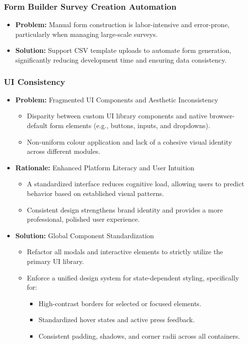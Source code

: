 \documentclass{article}
\begin{document}
\subsubsection{Form Builder Survey Creation Automation}

\begin{itemize}
    \item \textbf{Problem:} Manual form construction is labor-intensive and
    error-prone, particularly when managing large-scale surveys.
    \item \textbf{Solution:} Support CSV template uploads to automate form
    generation, significantly reducing development time and ensuring data
    consistency.
\end{itemize}

\subsubsection{UI Consistency}
\begin{itemize}
    \item \textbf{Problem:} Fragmented UI Components and Aesthetic Inconsistency
    \begin{itemize}
        \item Disparity between custom UI library components and native
        browser-default form elements (e.g., buttons, inputs, and dropdowns).
        \item Non-uniform colour application and lack of a cohesive visual
        identity across different modules.
    \end{itemize}
    
    \item \textbf{Rationale:} Enhanced Platform Literacy and User Intuition
    \begin{itemize}
        \item A standardized interface reduces cognitive load, allowing users to
        predict behavior based on established visual patterns.
        \item Consistent design strengthens brand identity and provides a more
        professional, polished user experience.
    \end{itemize}
    
    \item \textbf{Solution:} Global Component Standardization
    \begin{itemize}
        \item Refactor all modals and interactive elements to strictly utilize
        the primary UI library.
        \item Enforce a unified design system for state-dependent styling,
        specifically for:
        \begin{itemize}
            \item High-contrast borders for selected or focused elements.
            \item Standardized hover states and active press feedback.
            \item Consistent padding, shadows, and corner radii across all containers.
        \end{itemize}
    \end{itemize}
\end{itemize}
\end{document}
